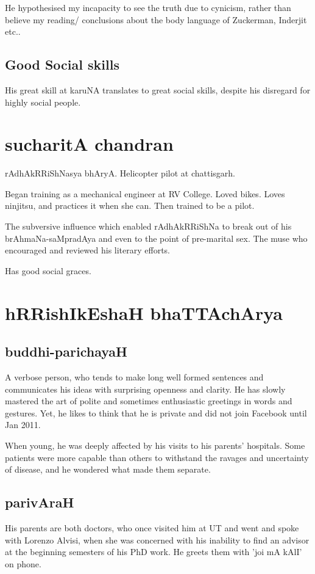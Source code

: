 \documentclass[oneside, article]{memoir}
\begin{document}
He hypothesised my incapacity to see the truth due to cynicism, rather than believe my reading/ conclusions about the body language of Zuckerman, Inderjit etc..

\section{Good Social skills}
His great skill at karuNA translates to great social skills, despite his disregard for highly social people.

\chapter{sucharitA chandran}
rAdhAkRRiShNasya bhAryA. Helicopter pilot at chattisgarh.

Began training as a mechanical engineer at RV College. Loved bikes. Loves ninjitsu, and practices it when she can. Then trained to be a pilot.

The subversive influence which enabled rAdhAkRRiShNa to break out of his brAhmaNa-saMpradAya and even to the point of pre-marital sex. The muse who encouraged and reviewed his literary efforts.

Has good social graces.

\chapter{hRRishIkEshaH bhaTTAchArya}
\section{buddhi-parichayaH}
A verbose person, who tends to make long well formed sentences and communicates his ideas with surprising openness and clarity. He has slowly mastered the art of polite and sometimes enthusiastic greetings in words and gestures. Yet, he likes to think that he is private and did not join Facebook until Jan 2011.

When young, he was deeply affected by his visits to his parents' hospitals. Some patients were more capable than others to withstand the ravages and uncertainty of disease, and he wondered what made them separate.

\section{parivAraH}
His parents are both doctors, who once visited him at UT and went and spoke with Lorenzo Alvisi, when she was concerned with his inability to find an advisor at the beginning semesters of his PhD work. He greets them with 'joi mA kAlI' on phone.
\end{document}
